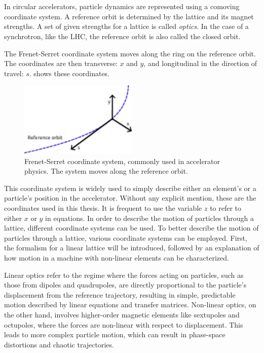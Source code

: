 \section{}

In circular accelerators, particle dynamics are represented using a comoving coordinate system.
A reference orbit is determined by the lattice and its magnet strengths. A set of given strengths 
for a lattice is called \textit{optics}. In the case of a synchrotron, like the LHC, the reference
orbit is also called the closed orbit.

The Frenet-Serret coordinate system moves along the ring on the reference orbit. The coordinates are
then transverse: $x$ and $y$, and longitudinal in the direction of travel: $s$.
 shows these coordinates.

\begin{figure}[H]
    \centering
    \includegraphics[width=0.5\textwidth]{images/frenet.pdf}
    \caption{Frenet-Serret coordinate system, commonly used in accelerator physics. The system moves
    along the reference orbit.}
    \label{fig:coordinate_systems:frenet_serret}
\end{figure}

This coordinate system is widely used to simply describe either an element's or a particle's
position in the accelerator. Without any explicit mention, these are the coordinates used in this
thesis. It is frequent to use the variable $z$ to refer to either $x$ or $y$ in equations.
In order to describe the motion of particles through a lattice, different coordinate systems can be
used. To better describe the motion of particles through a lattice, various coordinate systems can
be employed. First, the formalism for a linear lattice will be introduced, followed by an
explanation of how motion in a machine with non-linear elements can be characterized.

Linear optics refer to the regime where the forces acting on particles, such as those from dipoles
and quadrupoles, are directly proportional to the particle's displacement from the reference
trajectory, resulting in simple, predictable motion described by linear equations and transfer
matrices. Non-linear optics, on the other hand, involves higher-order magnetic elements like
sextupoles and octupoles, where the forces are non-linear with respect to displacement. This leads
to more complex particle motion, which can result in phase-space distortions and chaotic
trajectories.


